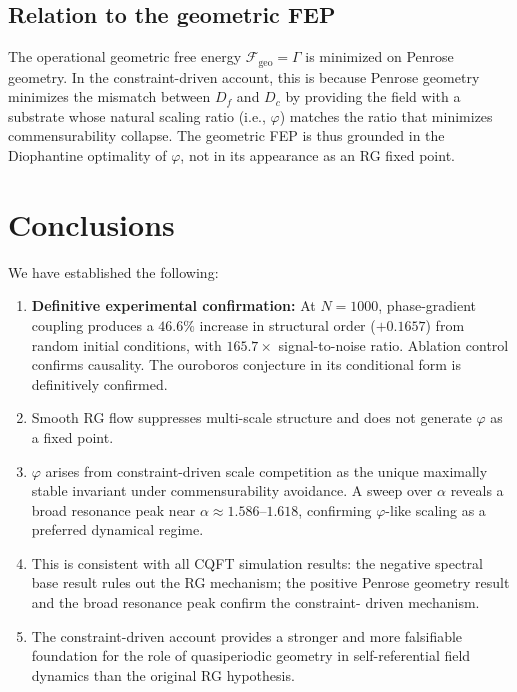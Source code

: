 \documentclass[11pt,a4paper]{article}
\theoremstyle{plain}
\theoremstyle{definition}
\newcommand{\phiGolden}{\varphi}
\begin{document}
\subsection{Relation to the geometric FEP}

The operational geometric free energy $\mathcal{F}_{\text{geo}} = \Gamma$
is minimized on Penrose geometry. In the constraint-driven account, this
is because Penrose geometry minimizes the mismatch between $D_f$ and
$D_c$ by providing the field with a substrate whose natural scaling ratio
(i.e., $\phiGolden$) matches the ratio that minimizes commensurability
collapse. The geometric FEP is thus grounded in the Diophantine
optimality of $\phiGolden$, not in its appearance as an RG fixed point.

\section{Conclusions}
\label{sec:conclusions}

We have established the following:

\begin{enumerate}[noitemsep]
  \item \textbf{Definitive experimental confirmation:} At $N = 1000$,
    phase-gradient coupling produces a $46.6\%$ increase in structural
    order ($+0.1657$) from random initial conditions, with $165.7\times$
    signal-to-noise ratio. Ablation control confirms causality.
    The ouroboros conjecture in its conditional form is definitively
    confirmed.

  \item Smooth RG flow suppresses multi-scale structure and does not
    generate $\phiGolden$ as a fixed point.

  \item $\phiGolden$ arises from constraint-driven scale competition as
    the unique maximally stable invariant under commensurability avoidance.
    A sweep over $\alpha$ reveals a broad resonance peak near
    $\alpha \approx 1.586$--$1.618$, confirming $\phiGolden$-like scaling
    as a preferred dynamical regime.

  \item This is consistent with all CQFT simulation results: the negative
    spectral base result rules out the RG mechanism; the positive Penrose
    geometry result and the broad resonance peak confirm the constraint-
    driven mechanism.

  \item The constraint-driven account provides a stronger and more
    falsifiable foundation for the role of quasiperiodic geometry in
    self-referential field dynamics than the original RG hypothesis.
\end{enumerate}
\end{document}

